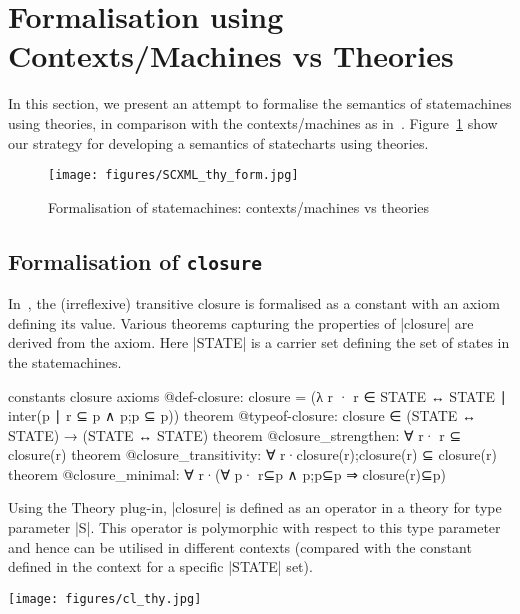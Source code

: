 \section{Formalisation using Contexts/Machines vs Theories}
\label{sec:formalisation}

In this section, we present an attempt to formalise the semantics of statemachines using theories, in comparison with the contexts/machines as in~\cite{DBLP:conf/ictac/WrightHSB23}. Figure~\ref{fig:scxml-thy-form} show our strategy for developing a semantics of statecharts using theories.
\begin{figure}
    \centering
    \texttt{[image: figures/SCXML\_thy\_form.jpg]}
    \caption{Formalisation of statemachines: contexts/machines vs theories}
    \label{fig:scxml-thy-form}
\end{figure}

\subsection{Formalisation of \texttt{closure}}
In~\cite{DBLP:conf/ictac/WrightHSB23}, the (irreflexive) transitive closure is formalised as a constant with an axiom defining its value. Various theorems capturing the properties of |closure| are derived from the axiom. Here |STATE| is a carrier set defining the set of states in the statemachines.
\begin{EventBcode}
constants closure
axioms
	@def-closure: closure = (λ r · r ∈ STATE ↔ STATE ∣ inter({p ∣ r ⊆ p ∧ p;p ⊆ p}))
	theorem @typeof-closure: closure ∈ (STATE ↔ STATE) → (STATE ↔ STATE)	
	theorem @closure_strengthen: ∀ r· r ⊆ closure(r)
	theorem @closure_transitivity: ∀ r·closure(r);closure(r) ⊆ closure(r) 	
	theorem @closure_minimal: ∀ r·(∀ p· r⊆p ∧ p;p⊆p ⇒ closure(r)⊆p)
\end{EventBcode}
Using the Theory plug-in, |closure| is defined as an operator in a theory for type parameter |S|. This operator is polymorphic with respect to this type parameter and hence can be utilised in different contexts (compared with the constant defined in the context for a specific |STATE| set).
\begin{center}
    \texttt{[image: figures/cl\_thy.jpg]}
\end{center}

